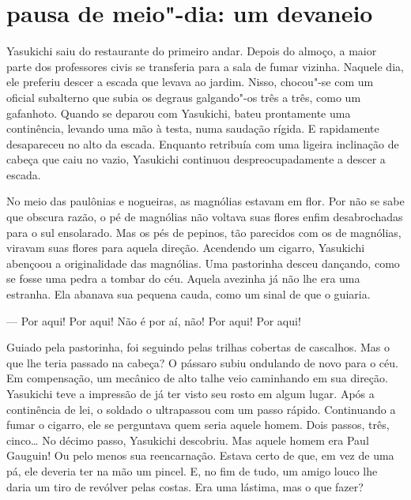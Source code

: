 \section*{pausa de meio"-dia: um devaneio}

Yasukichi saiu do restaurante do primeiro andar. Depois do almoço, a
maior parte dos professores civis se transferia para a sala de fumar
vizinha. Naquele dia, ele preferiu descer a escada que levava ao
jardim. Nisso, chocou"-se com um oficial subalterno que subia os degraus
galgando"-os três a três, como um gafanhoto. Quando se deparou com
Yasukichi, bateu prontamente uma continência, levando uma mão à testa,
numa saudação rígida. E rapidamente desapareceu no alto da escada.
Enquanto retribuía com uma ligeira inclinação de cabeça que caiu no
vazio, Yasukichi continuou despreocupadamente a descer a escada.

No meio das paulônias e nogueiras, as magnólias estavam em flor. Por não
se sabe que obscura razão, o pé de magnólias não voltava suas flores
enfim desabrochadas para o sul ensolarado. Mas os pés de pepinos, tão
parecidos com os de magnólias, viravam suas flores para aquela direção.
Acendendo um cigarro, Yasukichi abençoou a originalidade das magnólias.
Uma pastorinha desceu dançando, como se fosse uma pedra a tombar do
céu. Aquela avezinha já não lhe era uma estranha. Ela abanava sua
pequena cauda, como um sinal de que o guiaria.

--- Por aqui! Por aqui! Não é por aí, não! Por aqui! Por aqui!

Guiado pela pastorinha, foi seguindo pelas trilhas cobertas de
cascalhos. Mas o que lhe teria passado na cabeça? O pássaro subiu
ondulando de novo para o céu. Em compensação, um mecânico de alto talhe
veio caminhando em sua direção. Yasukichi teve a impressão de já ter
visto seu rosto em algum lugar. Após a continência de lei, o soldado o
ultrapassou com um passo rápido. Continuando a fumar o cigarro, ele se
perguntava quem seria aquele homem. Dois passos, três, cinco\ldots{} No
décimo passo, Yasukichi descobriu. Mas aquele homem era Paul Gauguin!
Ou pelo menos sua reencarnação. Estava certo de que, em vez de uma pá,
ele deveria ter na mão um pincel. E, no fim de tudo, um amigo louco lhe
daria um tiro de revólver pelas costas. Era uma lástima, mas o que fazer?

